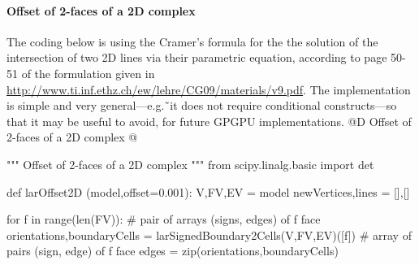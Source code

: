 \documentclass[11pt,oneside]{article}    %
\begin{document}
\paragraph{Offset of 2-faces of a 2D complex}
The coding below is using the Cramer's formula for the the solution of the intersection of two 2D lines via their parametric equation, according to page 50-51 of the formulation given in \href{http://www.ti.inf.ethz.ch/ew/lehre/CG09/materials/v9.pdf}{http://www.ti.inf.ethz.ch/ew/lehre/CG09/materials/v9.pdf}.
The implementation is  simple and very general---e.g.˜it does not require conditional constructs---so that it may be useful to avoid, for future GPGPU implementations.
@D Offset of 2-faces of a 2D complex
@{""" Offset of 2-faces of a 2D complex """
from scipy.linalg.basic import det

def larOffset2D (model,offset=0.001):
    V,FV,EV = model
    newVertices,lines = [],[]

    for f in range(len(FV)):
        # pair of arrays (signs, edges) of f face
        orientations,boundaryCells = larSignedBoundary2Cells(V,FV,EV)([f])
        # array of pairs (sign, edge) of f face
        edges = zip(orientations,boundaryCells)
        
}
\end{document}
